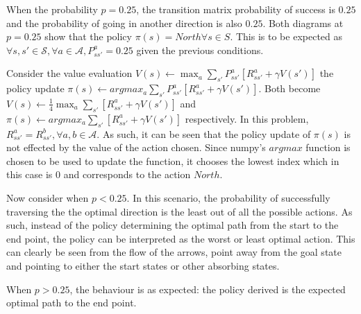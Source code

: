 \documentclass[12pt,a4paper]{report}
\begin{document}
\begin{landscape}
\begin{center}
\begin{tabular}{c || c  c  c}
    \end{tabular}        
\end{center}
\end{landscape}
\break

When the probability $p = 0.25$, the transition matrix probability
of success is $0.25$ and the probability of going in another direction
is also $0.25$.
Both diagrams at $p = 0.25$ show that the policy $\pi(s) = North \forall s \in S$.
This is to be expected as
$ \forall s, s' \in \mathcal{S}, \forall a \in \mathcal{A}, P^a_{ss'} = 0.25$ given 
the previous conditions. 

Consider the value evaluation 
$V(s) \leftarrow \max_a \sum_{s'} P^a_{ss'}[R^a_{ss'} + \gamma V(s')]$
the policy update $\pi(s) \leftarrow argmax_a \sum_{s'} P^a_{ss'}[R^a_{ss'} + \gamma V(s')]$.
Both become $V(s) \leftarrow \frac{1}{4}\max_a \sum_{s'} [R^a_{ss'} + \gamma V(s')]$
and $\pi(s) \leftarrow argmax_a \sum_{s'} [R^a_{ss'} + \gamma V(s')]$
respectively.
In this problem, $R^a_{ss'} = R^b_{ss'}, \forall a, b \in \mathcal{A}$. 
As such, it can be seen that the policy update of $\pi(s)$ is 
not effected by the value of the action chosen. Since numpy's
$argmax$ function is chosen to be used to update the function, 
it chooses the lowest index which in this case is $0$ and corresponds
to the action $North$. 

Now consider when $p < 0.25$.
In this scenario, the probability of successfully traversing the the
optimal direction is the least out of all the possible actions.
As such, instead of the policy determining the optimal path from the
start to the end point, the policy can be interpreted as the worst
or least optimal action. This can clearly be seen from the flow 
of the arrows, point away from the goal state and pointing to either
the start states or other absorbing states. 

When $p > 0.25$, the behaviour is as expected: the policy derived
is the expected optimal path to the end point.
\end{document}
